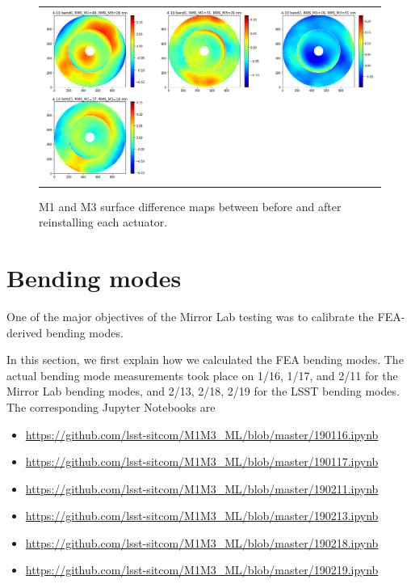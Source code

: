 \documentclass [twoside,openbib,12pt]{article}
\newcommand{\bitm}{\begin{itemize}}
\newcommand{\eitm}{\end{itemize}}
\begin{document}
 \begin{figure}[bthp]
   \begin{center}
   \begin{tabular}{c}
\includegraphics[width=150mm]{figures/reinstallDiff.png}
  \end{tabular}
   \end{center}
   \caption
  { \label{fig:reinstallDiff}
M1 and M3 surface difference maps between before and after reinstalling each actuator.
 }
\end{figure}

\section{Bending modes}

One of the major objectives of the Mirror Lab testing was to calibrate
the FEA-derived bending modes.

In this section, we first explain how we calculated the FEA bending
modes.
The actual bending mode measurements took place on 1/16, 1/17, and
2/11 for the Mirror Lab bending modes, and 2/13, 2/18, 2/19 for the
LSST bending modes.
The corresponding Jupyter Notebooks are
\bitm
\item \url{https://github.com/lsst-sitcom/M1M3_ML/blob/master/190116.ipynb}
\item \url{https://github.com/lsst-sitcom/M1M3_ML/blob/master/190117.ipynb}
\item \url{https://github.com/lsst-sitcom/M1M3_ML/blob/master/190211.ipynb}
\item \url{https://github.com/lsst-sitcom/M1M3_ML/blob/master/190213.ipynb}
\item \url{https://github.com/lsst-sitcom/M1M3_ML/blob/master/190218.ipynb}
\item \url{https://github.com/lsst-sitcom/M1M3_ML/blob/master/190219.ipynb}
\eitm
\end{document}
